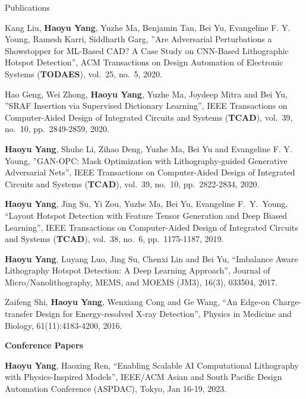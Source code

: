 \begin{rSection}{Publications}
\begin{description}[font=\normalfont]
\item[{[J6]}]{
	Kang Liu, \textbf{Haoyu Yang}, Yuzhe Ma, Benjamin Tan, Bei Yu, Evangeline F. Y. Young, Ramesh Karri, Siddharth Garg, ''Are Adversarial Perturbations a Showstopper for ML-Based CAD? A Case Study on CNN-Based Lithographic Hotspot Detection'', ACM Transactions on Design Automation of Electronic Systems (\textbf{TODAES}), vol.~25, no.~5, 2020.
}	
	
\item[{[J5]}]{
	Hao Geng, Wei Zhong, \textbf{Haoyu Yang}, Yuzhe Ma, Joydeep Mitra and Bei Yu, ''SRAF Insertion via Supervised Dictionary Learning'', IEEE Transactions on Computer-Aided Design of Integrated Circuits and Systems (\textbf{TCAD}), vol.~39, no.~10, pp.~2849-2859, 2020.
}	
	
\item[{[J4]}]{
	\textbf{Haoyu Yang}, Shuhe Li, Zihao Deng, Yuzhe Ma, Bei Yu and Evangeline F. Y. Young, ''GAN-OPC: Mask Optimization with Lithography-guided Generative Adversarial Nets'', IEEE Transactions on Computer-Aided Design of Integrated Circuits and Systems (\textbf{TCAD}), vol.~39, no.~10, pp.~2822-2834, 2020.
}

\item[{[J3]}]{
	\textbf{Haoyu Yang}, Jing Su, Yi Zou, Yuzhe Ma, Bei Yu, Evangeline F.~Y.~Young, ``Layout Hotspot Detection with Feature Tensor Generation and Deep Biased Learning'', IEEE Transactions on Computer-Aided Design of Integrated Circuits and Systems (\textbf{TCAD}), vol.~38, no.~6, pp.~1175-1187, 2019.
}
	
\item[{[J2]}]{
	\textbf{Haoyu Yang}, Luyang Luo, Jing Su, Chenxi Lin and Bei Yu, ``Imbalance Aware Lithography Hotspot Detection: A Deep Learning Approach'', Journal of Micro/Nanolithography, MEMS, and MOEMS (JM3), 16(3), 033504, 2017.
}

\item[{[J1]}]{
    Zaifeng Shi, \textbf{Haoyu Yang}, Wenxiang Cong and Ge Wang,
    ``An Edge-on Charge-transfer Design for Energy-resolved X-ray Detection'',
    Physics in Medicine and Biology, 61(11):4183-4200, 2016.
}

\end{description}

\textbf{Conference Papers}
\begin{description}[font=\normalfont]
	\item[{[C26]}] \textbf{Haoyu Yang}, Haoxing Ren, ``Enabling Scalable AI Computational Lithography with Physics-Inspired Models'', IEEE/ACM Asian and South Pacific Design Automation Conference (ASPDAC), Tokyo, Jan 16-19, 2023.
	

\end{description}
\end{rSection}
